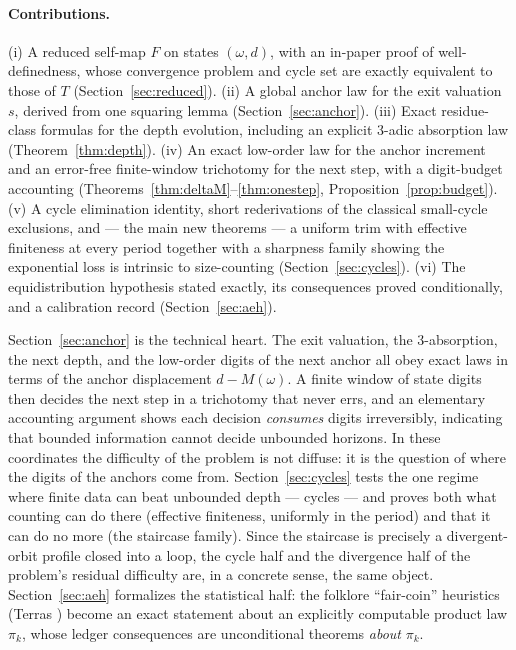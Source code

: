 \documentclass[11pt]{article}
\theoremstyle{remark}
\newcommand{\w}{\omega}
\begin{document}
\paragraph{Contributions.} (i) A reduced self-map $F$ on states $(\w,d)$, with an in-paper proof of well-definedness, whose convergence problem and cycle set are exactly equivalent to those of $T$ (Section~\ref{sec:reduced}). (ii) A global anchor law for the exit valuation $s$, derived from one squaring lemma (Section~\ref{sec:anchor}). (iii) Exact residue-class formulas for the depth evolution, including an explicit $3$-adic absorption law (Theorem~\ref{thm:depth}). (iv) An exact low-order law for the anchor increment and an error-free finite-window trichotomy for the next step, with a digit-budget accounting (Theorems~\ref{thm:deltaM}--\ref{thm:onestep}, Proposition~\ref{prop:budget}). (v) A cycle elimination identity, short rederivations of the classical small-cycle exclusions, and --- the main new theorems --- a uniform trim with effective finiteness at every period together with a sharpness family showing the exponential loss is intrinsic to size-counting (Section~\ref{sec:cycles}). (vi) The equidistribution hypothesis stated exactly, its consequences proved conditionally, and a calibration record (Section~\ref{sec:aeh}).

Section~\ref{sec:anchor} is the technical heart. The exit valuation, the $3$-absorption, the next depth, and the low-order digits of the next anchor all obey exact laws in terms of the anchor displacement $d - M(\w)$. A finite window of state digits then decides the next step in a trichotomy that never errs, and an elementary accounting argument shows each decision \emph{consumes} digits irreversibly, indicating that bounded information cannot decide unbounded horizons. In these coordinates the difficulty of the problem is not diffuse: it is the question of where the digits of the anchors come from. Section~\ref{sec:cycles} tests the one regime where finite data can beat unbounded depth --- cycles --- and proves both what counting can do there (effective finiteness, uniformly in the period) and that it can do no more (the staircase family). Since the staircase is precisely a divergent-orbit profile closed into a loop, the cycle half and the divergence half of the problem's residual difficulty are, in a concrete sense, the same object. Section~\ref{sec:aeh} formalizes the statistical half: the folklore ``fair-coin'' heuristics (Terras \cite{terras}) become an exact statement about an explicitly computable product law $\pi_k$, whose ledger consequences are unconditional theorems \emph{about} $\pi_k$.
\end{document}
